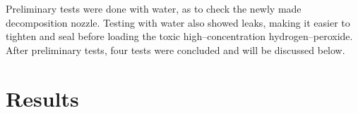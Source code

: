 	Preliminary tests were done with water, as to check the newly made decomposition nozzle. Testing with water also showed leaks, making it easier to tighten and seal before loading the toxic high--concentration hydrogen--peroxide. After preliminary tests, four tests were concluded and will be discussed below.

	\section{Results}



%

%

%
%
%
%
%
%
